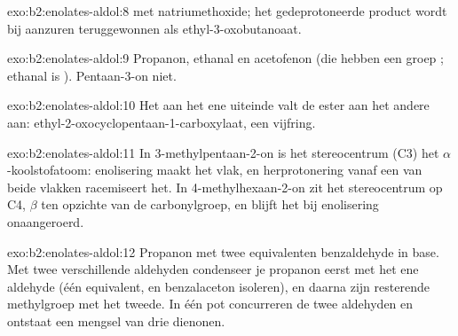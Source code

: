 \begin{solution}{exo:b2:enolates-aldol:8}
 met natriumethoxide; het gedeprotoneerde product wordt
bij aanzuren teruggewonnen als ethyl-3-oxobutanoaat.
\end{solution}

\begin{solution}{exo:b2:enolates-aldol:9}
Propanon, ethanal en acetofenon (die hebben een groep ; ethanal is ).
Pentaan-3-on niet.
\end{solution}

\begin{solution}{exo:b2:enolates-aldol:10}
Het  aan het ene uiteinde valt de ester aan het andere aan: ethyl-2-oxocyclopentaan-1-carboxylaat, een
vijfring.
\end{solution}

\begin{solution}{exo:b2:enolates-aldol:11}
In 3-methylpentaan-2-on is het stereocentrum (C3) het $\alpha$-koolstofatoom: enolisering maakt het vlak, en
herprotonering vanaf een van beide vlakken racemiseert het. In 4-methylhexaan-2-on zit het stereocentrum op C4,
$\beta$ ten opzichte van de carbonylgroep, en blijft het bij enolisering onaangeroerd.
\end{solution}

\begin{solution}{exo:b2:enolates-aldol:12}
Propanon met twee equivalenten benzaldehyde in base. Met twee verschillende aldehyden condenseer je
propanon eerst met het ene aldehyde (één equivalent, en benzalaceton isoleren), en daarna zijn
resterende methylgroep met het tweede. In één pot concurreren de twee aldehyden en ontstaat een mengsel van
drie dienonen.
\end{solution}

